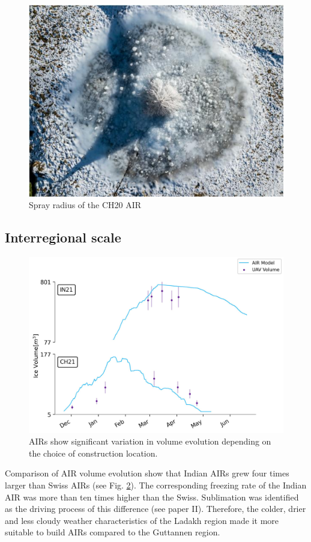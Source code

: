 \begin{figure}[htb]
\centering
\includegraphics[width=\textwidth]{figs/CH20_sprayrad.jpg}
\caption{Spray radius of the CH20 AIR } 
\label{fig:CH20_rad}
\end{figure}

\subsection{Interregional scale}

\begin{figure}[htb]
\centering
\includegraphics[width=12cm]{figs/IN21vsCH21.jpg}
\caption{AIRs show significant variation in volume evolution depending on the choice of construction location.}
\label{fig:2AIRs}
\end{figure}

Comparison of AIR volume evolution show that Indian AIRs grew four times larger than Swiss AIRs (see Fig.
\ref{fig:2AIRs}). The corresponding freezing rate of the Indian AIR was more than ten times higher than the
Swiss. Sublimation was identified as the driving process of this difference (see paper II). Therefore, the
colder, drier and less cloudy weather characteristics of the Ladakh region made it more suitable to build AIRs
compared to the Guttannen region.


